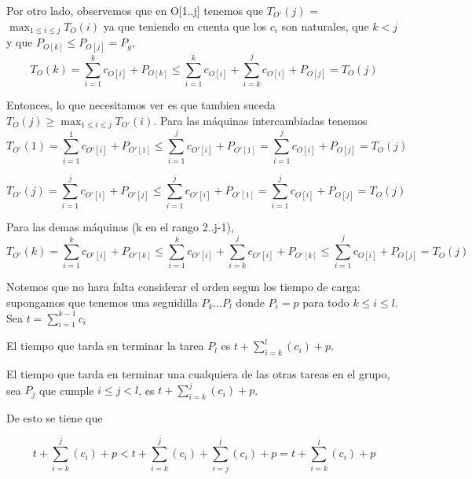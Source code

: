\begin{itemize}
          Por otro lado, observemos que en O[1..j] tenemos que $T_{O'}(j)$ = $\max_{1 \leq i \leq j} T_{O}(i)$
          ya que teniendo en cuenta que los $c_i$ son naturales, que $k < j$ y que $P_{O[k]} \leq P_{O[j]} = P_{g}$,
          $$ T_{O}(k) = \sum_{i = 1}^{k}{c_{O[i]}} + P_{O[k]}
                           \leq \sum_{i = 1}^{k}{c_{O[i]}} + \sum_{i = k}^{j}{c_{O[i]}}  + P_{O[j]}
                              = T_{O}(j)$$
                          
          Entonces, lo que necesitamos ver es que tambien suceda $T_{O}(j) \geq \displaystyle\max_{1 \leq i \leq j}T_{O'}(i)$.
          Para las m\'aquinas intercambiadas tenemos
          $$ T_{O'}(1) = \sum_{i = 1}^{1}{c_{O'[i]}} + P_{O'[1]}
                    \leq \sum_{i = 1}^{j}{c_{O'[i]}} + P_{O'[1]}
                       = \sum_{i = 1}^{j}{c_{O[i]}} + P_{O[j]}  
                       = T_{O}(j)$$
          
          $$ T_{O'}(j) = \sum_{i = 1}^{j}{c_{O'[i]}} + P_{O'[j]}
                    \leq \sum_{i = 1}^{j}{c_{O'[i]}} + P_{O'[1]}
                       = \sum_{i = 1}^{j}{c_{O[i]}} + P_{O[j]}  
                       = T_{O}(j)$$
          
          Para las demas m\'aquinas (k en el rango 2..j-1),
          $$ T_{O'}(k) = \sum_{i = 1}^{k}{c_{O'[i]}} + P_{O'[k]}
                    \leq \sum_{i = 1}^{k}{c_{O'[i]}} + \sum_{i = k}^{j}{c_{O'[i]}} + P_{O'[k]}
                    \leq \sum_{i = 1}^{j}{c_{O[i]}} + P_{O[j]} 
                    = T_{O}(j)$$
 
                
           
 
\end{itemize}

Notemos que no hara falta considerar el orden segun los tiempo de carga: supongamos que tenemos una seguidilla $P_k$...$P_l$  donde  $P_i = p$ para todo $k \leq i \leq l$. Sea $ t = \sum_{i = 1}^{k-1} c_i$

El tiempo que tarda en terminar la tarea $P_l$ es $ t + \sum_{ i = k }^{l}( c_i ) + p$.

El tiempo que tarda en terminar una cualquiera de las otras tareas en el grupo, sea $P_j$ que cumple $i \leq j < l$, es $t + \sum_{ i = k }^{j}( c_i ) + p$.

De esto se tiene que

$$t + \sum_{ i = k }^{j}( c_i ) + p < t + \sum_{ i = k }^{j}( c_i ) + \sum_{ i = j}^{l}( c_i ) + p = t + \sum_{ i = k }^{l}( c_i ) + p$$

